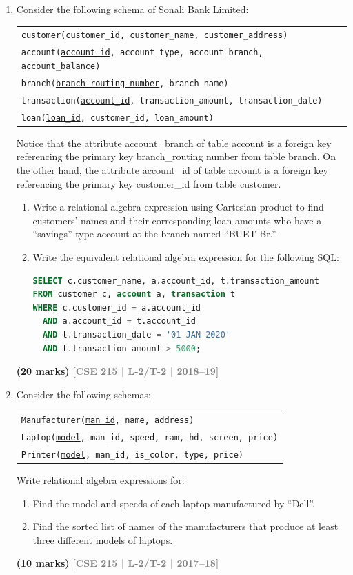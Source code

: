 \documentclass[12pt]{article}
\newcommand{\yr}[1]{\hfill\textcolor{gray}{\small\textbf{[#1]}}}
\newcommand{\mk}[1]{\textcolor{orange!70!black}{\small\textbf{(#1 marks)}}}
\begin{document}
\begin{enumerate}
\item Consider the following schema of Sonali Bank Limited:
\begin{center}
\begin{tabular}{l}
\texttt{customer(\underline{customer\_id}, customer\_name, customer\_address)}\\
\texttt{account(\underline{account\_id}, account\_type, account\_branch, account\_balance)}\\
\texttt{branch(\underline{branch\_routing\_number}, branch\_name)}\\
\texttt{transaction(\underline{account\_id}, transaction\_amount, transaction\_date)}\\
\texttt{loan(\underline{loan\_id}, customer\_id, loan\_amount)}
\end{tabular}
\end{center}
Notice that the attribute account_branch of table account is a foreign key referencing
the primary key branch_routing number from table branch. On the other hand,
the attribute account_id of table account is a foreign key referencing the primary key
customer_id from table customer.
\begin{enumerate}
  \item Write a relational algebra expression using Cartesian product to find customers' names and their corresponding loan amounts who have a ``savings'' type account at the branch named ``BUET Br.''.
  \item Write the equivalent relational algebra expression for the following SQL:
\begin{lstlisting}[language=SQL]
SELECT c.customer_name, a.account_id, t.transaction_amount
FROM customer c, account a, transaction t
WHERE c.customer_id = a.account_id
  AND a.account_id = t.account_id
  AND t.transaction_date = '01-JAN-2020'
  AND t.transaction_amount > 5000;
\end{lstlisting}
\end{enumerate}
\mk{20} \yr{CSE 215 | L-2/T-2 | 2018--19}


\item Consider the following schemas:
\begin{center}
\begin{tabular}{l}
\texttt{Manufacturer(\underline{man\_id}, name, address)}\\
\texttt{Laptop(\underline{model}, man\_id, speed, ram, hd, screen, price)}\\
\texttt{Printer(\underline{model}, man\_id, is\_color, type, price)}
\end{tabular}
\end{center}
Write relational algebra expressions for:
\begin{enumerate}
  \item Find the model and speeds of each laptop manufactured by ``Dell''.
  \item Find the sorted list of names of the manufacturers that produce at least three different models of laptops.
\end{enumerate}
\mk{10} \yr{CSE 215 | L-2/T-2 | 2017--18}



\end{enumerate}
\end{document}
